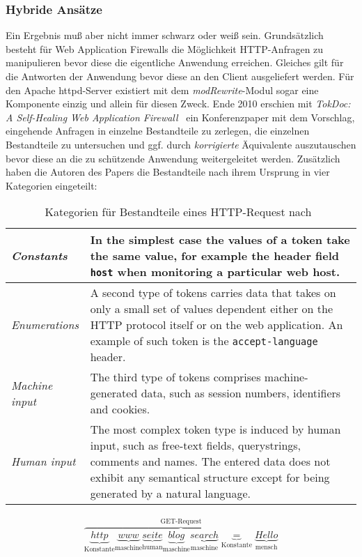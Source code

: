 \subsubsection{Hybride Ansätze} %
Ein Ergebnis muß aber nicht immer schwarz oder weiß sein.  Grundsätzlich besteht für Web Application Firewalls die Möglichkeit HTTP-Anfragen zu manipulieren bevor diese die eigentliche Anwendung erreichen. Gleiches gilt für die Antworten der Anwendung bevor diese an den Client ausgeliefert werden. Für den Apache httpd-Server existiert mit dem \emph{modRewrite}-Modul sogar eine Komponente einzig und allein für diesen Zweck. Ende 2010 erschien mit \glqq\emph{TokDoc: A Self-Healing Web Application Firewall}\grqq~\cite{Krueger2010} ein Konferenzpaper mit dem Vorschlag, eingehende Anfragen in einzelne Bestandteile zu zerlegen, die einzelnen Bestandteile zu untersuchen und ggf. durch \emph{korrigierte} Äquivalente auszutauschen bevor diese an die zu schützende Anwendung weitergeleitet werden. Zusätzlich haben die Autoren des Papers die Bestandteile nach ihrem Ursprung in vier Kategorien eingeteilt:

\begin{table}[h]
  \centering
  \begin{tabular}{|l|p{8cm}|}
    \hline
    \emph{Constants} & In the simplest case the values of a token take the same value, for example the header field \verb=host= when monitoring a particular web host. \\
    \hline
    \emph{Enumerations} &  A second type of tokens carries data that takes on only a small set of values dependent either on the HTTP protocol itself or on the web application. An example of such token is the \verb=accept-language= header.\\
    \hline
    \emph{Machine input} & The third type of tokens comprises machine-generated data, such as session numbers, identifiers and cookies. \\
    \hline
    \emph{Human input} & The most complex token type is induced by human input, such as free-text fields, querystrings, comments and names. The entered data does not exhibit any semantical structure except for being generated by a natural language.  \\
    \hline
  \end{tabular}
  \caption{Kategorien für Bestandteile eines HTTP-Request  nach~\cite{Krueger2010}}
  \label{tab:tocdoc}
\end{table}

\begin{align}
  \overbrace{
    \underbrace{http}_\text{Konstante} \underbrace{www}_\text{maschine}\underbrace{seite}_\text{human}\underbrace{blog}_\text{maschine}\underbrace{search}_\text{maschine}\underbrace{=}_\text{Konstante}\underbrace{Hello}_\text{mensch}
  }^\text{GET-Request}
\end{align}

